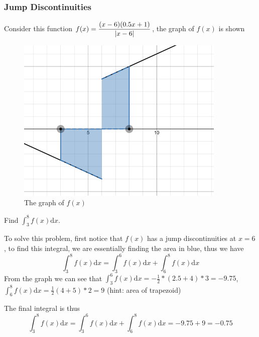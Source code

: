 \documentclass{article}
\begin{document}
\subsubsection{Jump Discontinuities}
Consider this function $\displaystyle f(x) = \frac{(x-6)(0.5x+1)}{\abs{x-6}}$, the graph of $f(x)$ is shown
\begin{figure}[H]
    \includegraphics[width=10cm]{jump.png}
    \centering
    \caption{The graph of $f(x)$}
\end{figure}
Find $\displaystyle \int_{3}^{8}f(x)\mathrm{d}x$.

To solve this problem, first notice that $f(x)$ has a jump discontinuities at $x=6$, to find this integral, we are essentially finding the area in blue, thus we have
\[
\int_{3}^{8} f(x)\mathrm{d}x = \int_{3}^{6} f(x)\mathrm{d}x + \int_{6}^{8}f(x) \mathrm{d}x
\]
From the graph we can see that $\displaystyle \int_{3}^{6} f(x)\mathrm{d}x = -\frac{1}{2}*(2.5+4)*3 = -9.75$, $\displaystyle \int_{6}^{8} f(x)\mathrm{d}x = \frac{1}{2} (4+5)*2 = 9$ (hint: area of trapezoid)

The final integral is thus
\[
\int_{3}^{8} f(x)\mathrm{d}x = \int_{3}^{6} f(x)\mathrm{d}x + \int_{6}^{8}f(x) \mathrm{d}x = -9.75 + 9 = -0.75
\]
\end{document}
